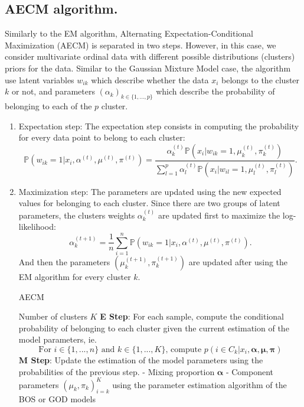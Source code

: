 \subsection{AECM algorithm.} 
\label{sec:aecm}

Similarly to the EM algorithm, Alternating Expectation-Conditional Maximization (AECM) \citep{meng1997algorithm} is separated in two steps. However, in this case, we consider multivariate ordinal data with different possible distributions (clusters) priors for the data. Similar to the Gaussian Mixture Model case, the algorithm use latent variables $w_{ik}$ which describe whether the data $x_i$ belongs to the cluster $k$ or not, and parameters $(\alpha_k)_{k\in \{1, \ldots, p\}}$ which describe the probability of belonging to each of the $p$ cluster. 
\begin{enumerate}
    \item Expectation step: The expectation step consists in computing the probability for every data point to belong to each cluster:
    \begin{equation}
        \mathbb{P}(w_{ik}=1|x_i, \alpha^{(t)}, \mu^{(t)}, \pi^{(t)}) = \frac{\alpha_k^{(t)}\mathbb{P}(x_i|w_{ik}=1, \mu_k^{(t)}, \pi_k^{(t)})}{\sum_{l=1}^p\alpha_l^{(t)}\mathbb{P}(x_i|w_{il}=1, \mu_l^{(t)}, \pi_l^{(t)})}.
    \end{equation}
    \item Maximization step: The parameters are updated using the new expected values for belonging to each cluster. Since there are two groups of latent parameters, the clusters weights $\alpha_k^{(t)}$ are updated first to maximize the log-likelihood:
    \begin{equation}
    \alpha_k^{(t+1)} = \frac{1}{n} \sum_{i=1}^n \mathbb{P}(w_{ik}=1|x_i, \alpha^{(t)}, \mu^{(t)}, \pi^{(t)}).
    \end{equation}
    And then the parameters $(\mu_k^{(t+1)}, \pi_k^{(t+1)})$ are updated after using the EM algorithm for every cluster $k$.

\begin{algorithm}
\caption{AECM}
\label{alg:aecm}
\begin{algorithmic}[1]
\Require Number of clusters $K$
    \State \textbf{E Step}: For each sample, compute the conditional probability of belonging to each cluster given the current estimation of the model parameters, ie.
    $$\text{For $i\in\{1,...,n\}$ and $k\in\{1,...,K\}$, compute }p(i\in C_k | x_i, \boldsymbol{\alpha}, \boldsymbol{\mu}, \boldsymbol{\pi})$$
    \State \textbf{M Step}: Update the estimation of the model parameters using the probabilities of the previous step.
    \State \quad - Mixing proportion $\boldsymbol{\alpha}$
    \State \quad - Component parameters $(\mu_k,\pi_k)_{i=k}^K$ using the parameter estimation algorithm of the BOS or GOD models
\EndWhile
\end{algorithmic}
\end{algorithm}
\end{enumerate}


